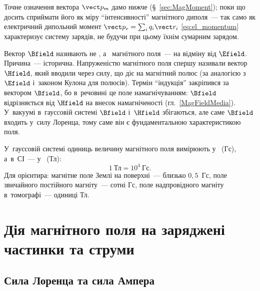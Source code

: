 Точне означення вектора $\vect p_m$ дамо нижче (§~\ref{sec:MagMoment}); поки що досить
сприймати його як міру \enquote{інтенсивності} магнітного диполя~--- так само як
електричний дипольний момент $\vect p_e=\sum_i q_i\vect r_i$ \eqref{eq:el_momentum}
характеризує систему зарядів, не будучи при цьому їхнім сумарним зарядом.

\begin{Historical}
	Вектор $\Bfield$ називають не , а~ магнітного
	поля~--- на відміну від $\Efield$. Причина~--- історична. Напруженістю магнітного поля
	спершу називали вектор $\Hfield$, який вводили через силу, що діє на магнітний полюс
	(за аналогією з~$\Efield$ і~законом Кулона для полюсів). Термін \enquote{індукція}
	закріпився за вектором $\Bfield$, бо в~речовині це поле 
	намагнічуванням: $\Bfield$ відрізняється від $\Hfield$ на внесок намагніченості
	(гл.~\ref{MagFieldMedia}). У~вакуумі в~гауссовій системі $\Bfield$ і~$\Hfield$
	збігаються, але саме $\Bfield$ входить у~силу Лоренца, тому саме він є фундаментальною
	характеристикою поля.
\end{Historical}

У~гауссовій системі одиниць величину магнітного поля вимірюють у~ (Гс),
а~в~СІ~--- у~ (Тл):
\begin{equation*}
	1\ \text{Тл} = 10^4\ \text{Гс}.
\end{equation*}
Для орієнтира: магнітне поле Землі на поверхні~--- близько $0{,}5$~Гс, поле звичайного
постійного магніту~--- сотні Гс, поле надпровідного магніту в~томографі~--- одиниці Тл.


\section{Дія магнітного поля на заряджені частинки та струми} \hypertarget{magnetic-force-on-charges-currents}{}


\subsection*{Сила Лоренца та сила Ампера}


